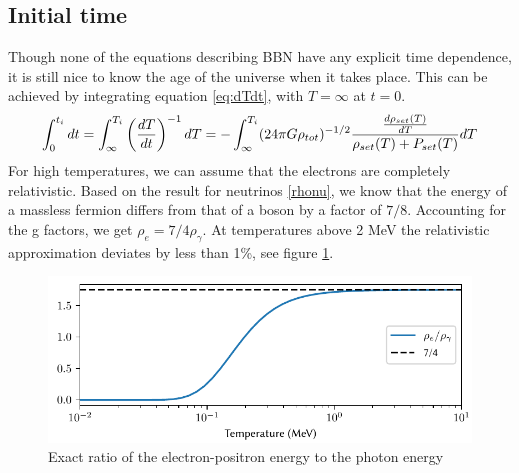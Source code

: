 \subsection{Initial time}
\label{sec:t_ini}
Though none of the equations describing BBN have any explicit time dependence, it is still nice to know the age of the universe when it takes place. This can be achieved by integrating equation \eqref{eq:dTdt}, with $T=\infty$ at $t=0$.
\begin{align}
    \int_{0}^{t_i}dt=\int_{\infty}^{T_i}\left(\frac{dT}{dt}\right)^{-1}dT=-\int_{\infty}^{T_i}(24\pi G\rho_{tot})^{-1/2}\frac{\frac{d\rho_{set}(T)}{dT}}{\rho_{set}(T) + P_{set}(T)}dT
    \label{eq:ti_integral}
\end{align}
For high temperatures, we can assume that the electrons are completely relativistic. Based on the result for neutrinos \eqref{rhonu}, we know that the energy of a massless fermion differs from that of a boson by a factor of $7/8$. Accounting for the g factors, we get $\rho_e=7/4 \rho_\gamma$. At temperatures above 2 MeV the relativistic approximation deviates by less than 1\%, see figure \ref{fig:rhoegammaT}.
\begin{figure}[ht]
    \includegraphics[width=5.1in]{figures/rhoegammaT.pdf}
    \caption{Exact ratio of the electron-positron energy to the photon energy}
    \label{fig:rhoegammaT}
\end{figure}

